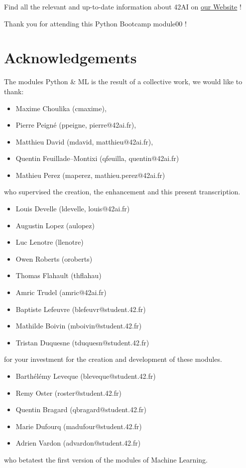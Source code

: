 \documentclass{42-en}
\begin{document}
Find all the relevant and up-to-date information about 42AI on \href{https://42-ai.github.io}{our Website} ! 

Thank you for attending this Python Bootcamp module00 !
\section*{Acknowledgements}
The modules Python \& ML is the result of a collective work, we would like to thank:
\begin{itemize}
  \item Maxime Choulika (cmaxime),
  \item Pierre Peigné (ppeigne, pierre@42ai.fr),
  \item Matthieu David (mdavid, matthieu@42ai.fr),
  \item Quentin Feuillade--Montixi (qfeuilla, quentin@42ai.fr)
  \item Mathieu Perez (maperez, mathieu.perez@42ai.fr)
\end{itemize}
who supervised the creation, the enhancement and this present transcription.

\begin{itemize}
    \item Louis Develle (ldevelle, louis@42ai.fr)
    \item Augustin Lopez (aulopez)
    \item Luc Lenotre (llenotre)
    \item Owen Roberts (oroberts)
    \item Thomas Flahault (thflahau)
    \item Amric Trudel (amric@42ai.fr)
    \item Baptiste Lefeuvre (blefeuvr@student.42.fr)
    \item Mathilde Boivin (mboivin@student.42.fr)
    \item Tristan Duquesne (tduquesn@student.42.fr)
\end{itemize}
for your investment for the creation and development of these modules.

\begin{itemize}
    \item Barthélémy Leveque (bleveque@student.42.fr)
    \item Remy Oster (roster@student.42.fr)
    \item Quentin Bragard (qbragard@student.42.fr)
    \item Marie Dufourq (madufour@student.42.fr)
    \item Adrien Vardon (advardon@student.42.fr)
\end{itemize}
who betatest the first version of the modules of Machine Learning.
\vfill
\doclicenseThis
\end{document}
